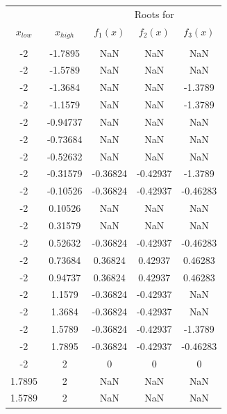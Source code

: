 \documentclass[11pt]{article}
\newcommand{\1}{\mathbbm{1}}
\begin{document}
	\begin{table}[H]
		\small
	\centering
	\begin{tabular}{c c |c c c }
		\hline
		\hline
		&&\multicolumn{3}{c}{Roots for }\\
		   $x_{low}$   &  $x_{high}$  & $f_{1}(x)$ &   $f_{2}(x)$  &  $f_{3}(x)$\\
		\hline                                                        
		&            &           &             &          \\
		-2  &   -1.7895  &       NaN &        NaN  &       NaN\\
		-2  &   -1.5789  &       NaN &        NaN  &       NaN\\
		-2  &   -1.3684  &       NaN &        NaN  &   -1.3789\\
		-2  &   -1.1579  &       NaN &        NaN  &   -1.3789\\
		-2  &  -0.94737  &       NaN &        NaN  &       NaN\\
		-2  &  -0.73684  &       NaN &        NaN  &       NaN\\
		-2  &  -0.52632  &       NaN &        NaN  &       NaN\\
		-2  &  -0.31579  &  -0.36824 &   -0.42937  &   -1.3789\\
		-2  &  -0.10526  &  -0.36824 &   -0.42937  &  -0.46283\\
		-2  &   0.10526  &       NaN &        NaN  &       NaN\\
		-2  &   0.31579  &       NaN &        NaN  &       NaN\\
		-2  &   0.52632  &  -0.36824 &   -0.42937  &  -0.46283\\
		-2  &   0.73684  &   0.36824 &    0.42937  &   0.46283\\
		-2  &   0.94737  &   0.36824 &    0.42937  &   0.46283\\
		-2  &    1.1579  &  -0.36824 &   -0.42937  &       NaN\\
		-2  &    1.3684  &  -0.36824 &   -0.42937  &       NaN\\
		-2  &    1.5789  &  -0.36824 &   -0.42937  &   -1.3789\\
		-2  &    1.7895  &  -0.36824 &   -0.42937  &  -0.46283\\
		-2  &         2  &         0 &          0  &         0\\
		1.7895  &         2  &       NaN &        NaN  &       NaN\\
		1.5789  &         2  &       NaN &        NaN  &       NaN\\

\end{tabular}
\end{table}
\end{document}
